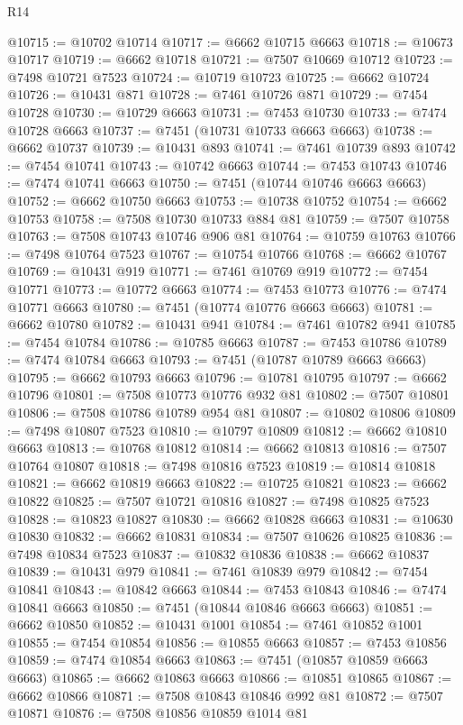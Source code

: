 \begin{lexlean}{R14}
\begin{coremodule}
@10715 := @10702 @10714
@10717 := @6662 @10715 @6663
@10718 := @10673 @10717
@10719 := @6662 @10718
@10721 := @7507 @10669 @10712
@10723 := @7498 @10721 @7523
@10724 := @10719 @10723
@10725 := @6662 @10724
@10726 := @10431 @871
@10728 := @7461 @10726 @871
@10729 := @7454 @10728
@10730 := @10729 @6663
@10731 := @7453 @10730
@10733 := @7474 @10728 @6663
@10737 := @7451 (@10731 @10733 @6663 @6663)
@10738 := @6662 @10737
@10739 := @10431 @893
@10741 := @7461 @10739 @893
@10742 := @7454 @10741
@10743 := @10742 @6663
@10744 := @7453 @10743
@10746 := @7474 @10741 @6663
@10750 := @7451 (@10744 @10746 @6663 @6663)
@10752 := @6662 @10750 @6663
@10753 := @10738 @10752
@10754 := @6662 @10753
@10758 := @7508 @10730 @10733 @884 @81
@10759 := @7507 @10758
@10763 := @7508 @10743 @10746 @906 @81
@10764 := @10759 @10763
@10766 := @7498 @10764 @7523
@10767 := @10754 @10766
@10768 := @6662 @10767
@10769 := @10431 @919
@10771 := @7461 @10769 @919
@10772 := @7454 @10771
@10773 := @10772 @6663
@10774 := @7453 @10773
@10776 := @7474 @10771 @6663
@10780 := @7451 (@10774 @10776 @6663 @6663)
@10781 := @6662 @10780
@10782 := @10431 @941
@10784 := @7461 @10782 @941
@10785 := @7454 @10784
@10786 := @10785 @6663
@10787 := @7453 @10786
@10789 := @7474 @10784 @6663
@10793 := @7451 (@10787 @10789 @6663 @6663)
@10795 := @6662 @10793 @6663
@10796 := @10781 @10795
@10797 := @6662 @10796
@10801 := @7508 @10773 @10776 @932 @81
@10802 := @7507 @10801
@10806 := @7508 @10786 @10789 @954 @81
@10807 := @10802 @10806
@10809 := @7498 @10807 @7523
@10810 := @10797 @10809
@10812 := @6662 @10810 @6663
@10813 := @10768 @10812
@10814 := @6662 @10813
@10816 := @7507 @10764 @10807
@10818 := @7498 @10816 @7523
@10819 := @10814 @10818
@10821 := @6662 @10819 @6663
@10822 := @10725 @10821
@10823 := @6662 @10822
@10825 := @7507 @10721 @10816
@10827 := @7498 @10825 @7523
@10828 := @10823 @10827
@10830 := @6662 @10828 @6663
@10831 := @10630 @10830
@10832 := @6662 @10831
@10834 := @7507 @10626 @10825
@10836 := @7498 @10834 @7523
@10837 := @10832 @10836
@10838 := @6662 @10837
@10839 := @10431 @979
@10841 := @7461 @10839 @979
@10842 := @7454 @10841
@10843 := @10842 @6663
@10844 := @7453 @10843
@10846 := @7474 @10841 @6663
@10850 := @7451 (@10844 @10846 @6663 @6663)
@10851 := @6662 @10850
@10852 := @10431 @1001
@10854 := @7461 @10852 @1001
@10855 := @7454 @10854
@10856 := @10855 @6663
@10857 := @7453 @10856
@10859 := @7474 @10854 @6663
@10863 := @7451 (@10857 @10859 @6663 @6663)
@10865 := @6662 @10863 @6663
@10866 := @10851 @10865
@10867 := @6662 @10866
@10871 := @7508 @10843 @10846 @992 @81
@10872 := @7507 @10871
@10876 := @7508 @10856 @10859 @1014 @81

\end{coremodule}
\end{lexlean}
